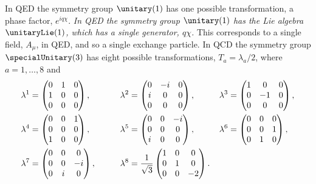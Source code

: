\documentclass[fleqn]{NotesClass}
\begin{document}
    In QED the symmetry group \(\unitary(1)\) has one possible transformation, a phase factor, \(e^{iq\chi}\).
    \textit{In QED the symmetry group \(\unitary(1)\) has the Lie algebra \(\unitaryLie(1)\), which has a single generator, \(q\chi\).}
    This corresponds to a single field, \(A_\mu\), in QED, and so a single exchange particle.
    In QCD the symmetry group \(\specialUnitary(3)\) has eight possible transformations, \(T_a = \lambda_a/2\), where \(a = 1, \dotsc, 8\) and
    \begin{align}
        \lambda^1 &= 
        \begin{pmatrix}
            0 & 1 & 0\\
            1 & 0 & 0\\
            0 & 0 & 0
        \end{pmatrix}
        ,\qquad & \lambda^2 &= 
        \begin{pmatrix}
            0 & -i & 0\\
            i & 0 & 0\\
            0 & 0 & 0
        \end{pmatrix}
        ,\qquad & \lambda^3 &= 
        \begin{pmatrix}
            1 & 0 & 0\\
            0 & -1 & 0\\
            0 & 0 & 0
        \end{pmatrix}
        ,\notag\\
        \lambda^4 &= 
        \begin{pmatrix}
            0 & 0 & 1\\
            0 & 0 & 0\\
            1 & 0 & 0
        \end{pmatrix}
        ,\qquad & \lambda^5 &= 
        \begin{pmatrix}
            0 & 0 & -i\\
            0 & 0 & 0\\
            i & 0 & 0
        \end{pmatrix}
        ,\qquad & \lambda^6 &= 
        \begin{pmatrix}
            0 & 0 & 0\\
            0 & 0 & 1\\
            0 & 1 & 0
        \end{pmatrix}
        ,\notag\\
        \lambda^7 &= 
        \begin{pmatrix}
            0 & 0 & 0\\
            0 & 0 & -i\\
            0 & i & 0
        \end{pmatrix}
        ,\qquad & \lambda^8 &= \frac{1}{\sqrt{3}}
        \begin{pmatrix}
            1 & 0 & 0\\
            0 & 1 & 0\\
            0 & 0 & -2
        \end{pmatrix}
        .
    \end{align}
\end{document}
